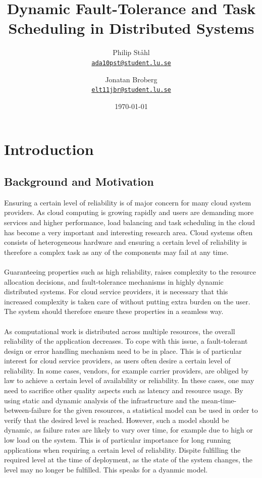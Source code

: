 \documentclass{cslthse-msc}
\author{
	Philip Ståhl \\
	{\normalsize \href{mailto:ada10pst@student.lu.se}{\texttt{ada10pst@student.lu.se}}}
	\and
	Jonatan Broberg \\
    {\normalsize \href{mailto:elt11jbr@student.lu.se
}{\texttt{elt11jbr@student.lu.se}}}
}
\title{Dynamic Fault-Tolerance and Task Scheduling in Distributed Systems}
\subtitle{}
\date{\today}
\begin{document}
\makefrontmatter

\chapter{Introduction} \label{ch:introduction} 
\section{Background and Motivation} 
Ensuring a certain level of reliability is of major concern for many cloud system providers. As cloud computing is growing rapidly and users are demanding more services and higher performance, load balancing and task scheduling in the cloud has become a very important and interesting research area. 
Cloud systems often consists of heterogeneous hardware and  ensuring a certain level of reliability is therefore a complex task as any of the components may fail at any time. 
\\\\
Guaranteeing properties such as high reliability, raises complexity to the resource allocation decisions, and fault-tolerance mechanisms in highly dynamic distributed systems. For cloud service providers, it is necessary that this increased complexity is taken care of without putting extra burden on the user. The system should therefore ensure these properties in a seamless way.
\\\\
As computational work is distributed across multiple resources, the overall reliability of the application decreases. To cope with this issue, a fault-tolerant design or error handling mechanism need to be in place. This is of particular interest for cloud service providers, as users often desire a certain level of reliability. In some cases, vendors, for example carrier providers, are obliged by law to achieve a certain level of availability or reliability. In these cases, one may need to sacrifice other quality aspects such as latency and resource usage. By using static and dynamic analysis of the infrastructure and the mean-time-between-failure for the given resources, a statistical model can be used in order to verify  that the desired level is reached. However, such a model should be dynamic, as failure rates are likely to vary over time, for example due to high or low load on the system. This is of particular importance for long running applications when requiring a certain level of reliability. Dispite fulfilling the required level at the time of deployment, as the state of the system changes, the level may no longer be fulfilled. This speaks for a dyanmic model.
\end{document}
